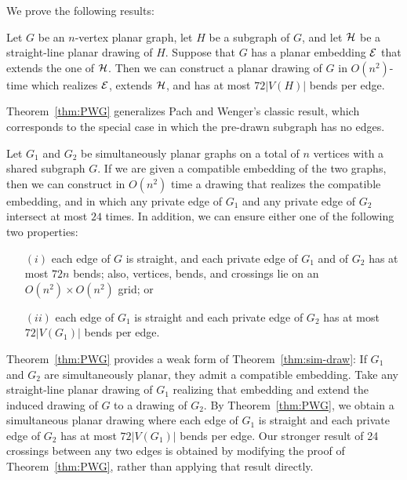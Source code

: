 \documentclass{llncs}
\begin{document}
We prove the following results:

\begin{theorem}\label{thm:PWG}
Let $G$ be an $n$-vertex planar graph, let $H$ be a subgraph of $G$, and let $\cal H$ be a straight-line planar drawing of $H$. Suppose that $G$ has a planar embedding $\cal E$ that extends the one of $\cal H$.
Then we can construct a planar drawing of $G$ in $O(n^2)$-time which realizes $\cal E$, extends $\cal H$, and has at most $72 |V(H)|$ bends per edge.
 \end{theorem}

Theorem~\ref{thm:PWG} generalizes Pach and Wenger's classic result, which corresponds to the special case in which the pre-drawn subgraph has no edges.

\begin{theorem}
\label{thm:sim-draw}
Let $G_1$ and $G_2$ be simultaneously planar graphs on a total of $n$ vertices with a shared subgraph $G$.
If we are given a compatible embedding of the two graphs, then we can construct in $O(n^2)$ time a drawing that realizes the compatible embedding, and in which
any private edge of $G_1$ and any private edge of $G_2$
intersect at most $24$ times. In addition, we can ensure either one of the following two properties:

\begin{enumerate}
\item[$(i)$] each edge of $G$ is straight, and each private edge of $G_1$ and of $G_2$ has at most $72n$ bends; also, vertices, bends, and crossings lie on an $O(n^2) \times O(n^2)$ grid; or
\item[$(ii)$] each edge of $G_1$ is straight and each private edge of $G_2$ has at most $72 |V(G_1)|$ bends per edge.
\end{enumerate}
\end{theorem}

 Theorem~\ref{thm:PWG} provides a weak form of Theorem~\ref{thm:sim-draw}: If $G_1$ and $G_2$ are simultaneously planar, they admit a compatible embedding. Take any straight-line planar drawing of $G_1$ realizing that embedding and extend the induced drawing of $G$ to a drawing of $G_2$. By Theorem~\ref{thm:PWG}, we obtain a simultaneous planar drawing where each edge of $G_1$ is straight and each private edge of $G_2$ has at most $72|V(G_1)|$ bends per edge. Our stronger result of 24 crossings between any two edges is  obtained by modifying the proof  of Theorem~\ref{thm:PWG}, rather than applying that result directly.
\end{document}
